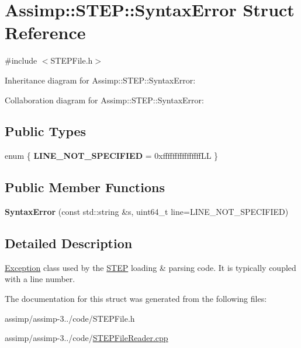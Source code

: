 \hypertarget{struct_assimp_1_1_s_t_e_p_1_1_syntax_error}{\section{Assimp\+:\+:S\+T\+E\+P\+:\+:Syntax\+Error Struct Reference}
\label{struct_assimp_1_1_s_t_e_p_1_1_syntax_error}
}


{\ttfamily \#include $<$S\+T\+E\+P\+File.\+h$>$}



Inheritance diagram for Assimp\+:\+:S\+T\+E\+P\+:\+:Syntax\+Error\+:


Collaboration diagram for Assimp\+:\+:S\+T\+E\+P\+:\+:Syntax\+Error\+:
\subsection*{Public Types}
\begin{DoxyCompactItemize}
\item 
\hypertarget{struct_assimp_1_1_s_t_e_p_1_1_syntax_error_ac03597ba543810e61442d60354950ee5}{enum \{ {\bfseries L\+I\+N\+E\+\_\+\+N\+O\+T\+\_\+\+S\+P\+E\+C\+I\+F\+I\+E\+D} = 0xffffffffffffffff\+L\+L
 \}}\label{struct_assimp_1_1_s_t_e_p_1_1_syntax_error_ac03597ba543810e61442d60354950ee5}

\end{DoxyCompactItemize}
\subsection*{Public Member Functions}
\begin{DoxyCompactItemize}
\item 
\hypertarget{struct_assimp_1_1_s_t_e_p_1_1_syntax_error_ab3a52ca0ec612516fdf8f3283d2ee56b}{{\bfseries Syntax\+Error} (const std\+::string \&s, uint64\+\_\+t line=L\+I\+N\+E\+\_\+\+N\+O\+T\+\_\+\+S\+P\+E\+C\+I\+F\+I\+E\+D)}\label{struct_assimp_1_1_s_t_e_p_1_1_syntax_error_ab3a52ca0ec612516fdf8f3283d2ee56b}

\end{DoxyCompactItemize}


\subsection{Detailed Description}
\hyperlink{class_exception}{Exception} class used by the \hyperlink{namespace_assimp_1_1_s_t_e_p}{S\+T\+E\+P} loading \& parsing code. It is typically coupled with a line number. 

The documentation for this struct was generated from the following files\+:\begin{DoxyCompactItemize}
\item 
assimp/assimp-\/3../code/S\+T\+E\+P\+File.\+h\item 
assimp/assimp-\/3../code/\hyperlink{_s_t_e_p_file_reader_8cpp}{S\+T\+E\+P\+File\+Reader.\+cpp}\end{DoxyCompactItemize}
